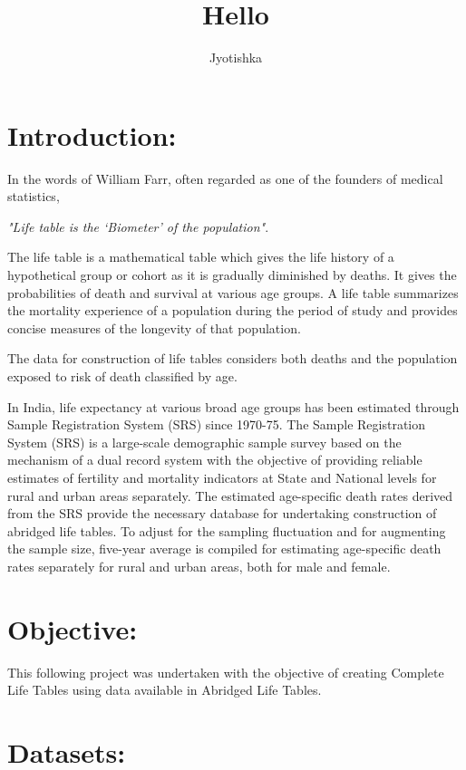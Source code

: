 \documentclass[
  14pt,
]{article}
\title{Hello}
\author{Jyotishka}
\date{}
\begin{document}
\maketitle

\section*{Introduction:}

In the words of William Farr, often regarded as one of the founders of
medical statistics,

\begin{center}\emph{"Life table is the ‘Biometer’ of the population"}. \end{center}

The life table is a mathematical table which gives the life history of a
hypothetical group or cohort as it is gradually diminished by deaths. It
gives the probabilities of death and survival at various age groups. A
life table summarizes the mortality experience of a population during
the period of study and provides concise measures of the longevity of
that population.

The data for construction of life tables considers both deaths and the
population exposed to risk of death classified by age.

In India, life expectancy at various broad age groups has been estimated
through Sample Registration System (SRS) since 1970-75. The Sample
Registration System (SRS) is a large-scale demographic sample survey
based on the mechanism of a dual record system with the objective of
providing reliable estimates of fertility and mortality indicators at
State and National levels for rural and urban areas separately. The
estimated age-specific death rates derived from the SRS provide the
necessary database for undertaking construction of abridged life tables.
To adjust for the sampling fluctuation and for augmenting the sample
size, five-year average is compiled for estimating age-specific death
rates separately for rural and urban areas, both for male and female.

\section*{Objective:}

This following project was undertaken with the objective of creating
Complete Life Tables using data available in Abridged Life Tables.

\section*{Datasets:}
\end{document}
